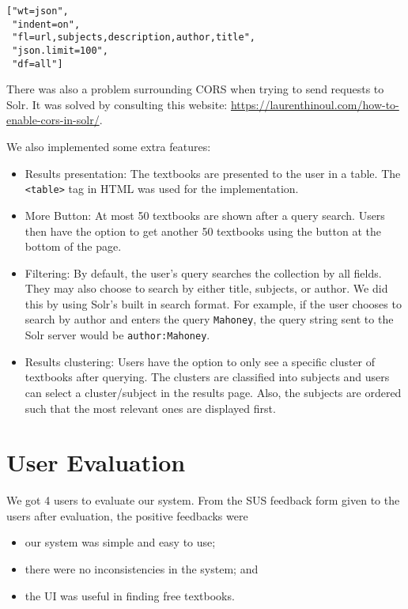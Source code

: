 \documentclass[a4paper,10pt]{report}
\begin{document}
\begin{verbatim}
["wt=json",
 "indent=on",
 "fl=url,subjects,description,author,title",
 "json.limit=100",
 "df=all"]
\end{verbatim}

There was also a problem surrounding CORS when trying to send requests to Solr. It was solved by consulting this website: \url{https://laurenthinoul.com/how-to-enable-cors-in-solr/}.

We also implemented some extra features:

\begin{itemize}
\item Results presentation: The textbooks are presented to the user in a table. The \verb|<table>| tag in HTML was used for the implementation.
\item More Button: At most 50 textbooks are shown after a query search. Users then have the option to get another 50 textbooks using the button at the bottom of the page.
\item Filtering: By default, the user's query searches the collection by all fields. They may also choose to search by either title, subjects, or author. We did this by using Solr's built in search format. For example, if the user chooses to search by author and enters the query \verb|Mahoney|, the query string sent to the Solr server would be \verb|author:Mahoney|.
\item Results clustering: Users have the option to only see a specific cluster of textbooks after querying. The clusters are classified into subjects and users can select a cluster/subject in the results page. Also, the subjects are ordered such that the most relevant ones are displayed first.
\end{itemize}

\section*{User Evaluation}

We got 4 users to evaluate our system. From the SUS feedback form given to the users after evaluation, the positive feedbacks were

\begin{itemize}
\item our system was simple and easy to use;
\item there were no inconsistencies in the system; and
\item the UI was useful in finding free textbooks.
\end{itemize}
\end{document}
